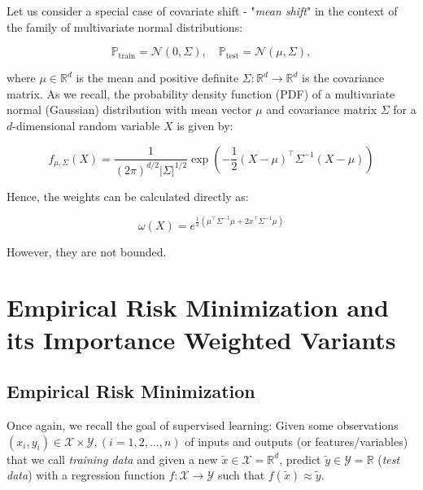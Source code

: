 \begin{example}
Let us consider a special case of covariate shift - "\emph{mean shift}" in the context of the family of multivariate normal distributions:

\begin{equation}
    \mathbb{P}_{\text{train}} = \mathcal{N}(0, \Sigma), \quad \mathbb{P}_{\text{test}} = \mathcal{N}(\mu, \Sigma),
    \label{eqn:4.11}
\end{equation}

where $\mu \in \mathbb{R}^d$ is the mean and positive definite $\Sigma: \mathbb{R}^d \to \mathbb{R}^d$ is the covariance matrix. As we recall, the probability density function (PDF) of a multivariate normal (Gaussian) distribution with mean vector $\mu$ and covariance matrix $\Sigma$ for a $d$-dimensional random variable $X$ is given by:

\begin{equation}
    f_{\mu, \Sigma}(X) = \frac{1}{(2\pi)^{d/2} \lvert \Sigma \rvert ^{1/2}} \exp \left( -\frac{1}{2}(X - \mu)^\top \Sigma^{-1} (X - \mu)\right)
    \label{eqn:4.12}
\end{equation}
$$$$

Hence, the weights can be calculated directly as:

\begin{equation}
    \omega(X) = e^{\frac{1}{2}(\mu^\top\Sigma^{-1}\mu + 2x^\top\Sigma^{-1}\mu)}
    \label{eqn:4.13}
\end{equation}

However, they are not bounded.
\end{example}

\section{Empirical Risk Minimization and its Importance Weighted Variants}

\subsection{Empirical Risk Minimization}

Once again, we recall the goal of supervised learning: Given some observations $(x_i, y_i) \in \mathcal{X} \times \mathcal{Y}, (i=1, 2, \dots,n)$ of inputs and outputs (or features/variables) that we call \textit{training data} and given a new $\tilde{x} \in \mathcal{X}=\mathbb{R}^d$, predict $\tilde{y} \in \mathcal{Y} = \mathbb{R}$ (\textit{test data}) with a regression function $f: \mathcal{X} \rightarrow \mathcal{Y}$ such that $f(\tilde{x}) \approx \tilde{y}$.\\

